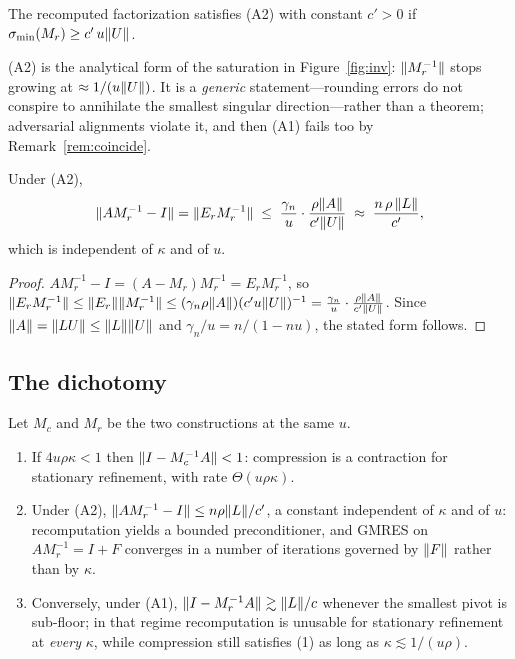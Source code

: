\begin{definition}\label{def:A2}
The recomputed factorization satisfies (A2) with constant $c'>0$ if
$\sigma_{\min}(M_r)\ge c'\,u\lVert U \rVert$.
\end{definition}

\begin{remark}
(A2) is the analytical form of the saturation in Figure~\ref{fig:inv}:
$\lVert M_r^{-1} \rVert$ stops growing at $\approx1/(u\lVert U \rVert)$. It is a
\emph{generic} statement---rounding errors do not conspire to annihilate the
smallest singular direction---rather than a theorem; adversarial alignments
violate it, and then (A1) fails too by Remark~\ref{rem:coincide}.
\end{remark}

\begin{proposition}\label{prop:recompute}
Under (A2),
\begin{equation}
  \lVert AM_r^{-1}-I \rVert=\lVert E_rM_r^{-1} \rVert
  \;\le\;\frac{\gamma_n}{u}\cdot\frac{\rho\lVert A \rVert}{c'\lVert U \rVert}
  \;\approx\;\frac{n\,\rho\,\lVert L \rVert}{c'},
\end{equation}
which is independent of $\kappa$ and of $u$.
\end{proposition}

\begin{proof}
$AM_r^{-1}-I=(A-M_r)M_r^{-1}=E_rM_r^{-1}$, so
$\lVert E_rM_r^{-1} \rVert\le\lVert E_r \rVert\lVert M_r^{-1} \rVert
\le(\gamma_n\rho\lVert A \rVert)(c'u\lVert U \rVert)^{-1}
=\frac{\gamma_n}{u}\cdot\frac{\rho\lVert A \rVert}{c'\lVert U \rVert}$.
Since $\lVert A \rVert=\lVert LU \rVert\le\lVert L \rVert\lVert U \rVert$ and
$\gamma_n/u=n/(1-nu)$, the stated form follows.
\end{proof}

\subsection{The dichotomy}

\begin{theorem}[Dichotomy]\label{thm:dichotomy}
Let $M_c$ and $M_r$ be the two constructions at the same $u$.
\begin{enumerate}
  \item If $4u\rho\kappa<1$ then $\lVert I-M_c^{-1}A \rVert<1$: compression is a
        contraction for stationary refinement, with rate $\Theta(u\rho\kappa)$.
  \item Under (A2), $\lVert AM_r^{-1}-I \rVert\le n\rho\lVert L \rVert/c'$, a constant
        independent of $\kappa$ and of $u$: recomputation yields a bounded
        preconditioner, and GMRES on $AM_r^{-1}=I+F$ converges in a number of
        iterations governed by $\lVert F \rVert$ rather than by $\kappa$.
  \item Conversely, under (A1),
        $\lVert I-M_r^{-1}A \rVert\gtrsim\lVert L \rVert/c$ whenever the smallest pivot is
        sub-floor; in that regime recomputation is unusable for stationary
        refinement at \emph{every} $\kappa$, while compression still satisfies
        (1) as long as $\kappa\lesssim1/(u\rho)$.
\end{enumerate}
\end{theorem}

